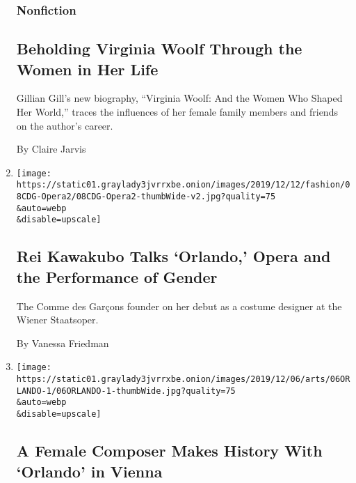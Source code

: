 \begin{enumerate}
  \hypertarget{nonfiction-1}{%
  \subsubsection{Nonfiction}\label{nonfiction-1}}

  \hypertarget{beholding-virginia-woolf-through-the-women-in-her-life}{%
  \subsection{Beholding Virginia Woolf Through the Women in Her
  Life}\label{beholding-virginia-woolf-through-the-women-in-her-life}}

  Gillian Gill's new biography, ``Virginia Woolf: And the Women Who
  Shaped Her World,'' traces the influences of her female family members
  and friends on the author's career.

  By Claire Jarvis
\item
  \href{/2019/12/08/style/rei-kawakubo-orlando-vienna-opera.html}{}

  \texttt{[image: https://static01.graylady3jvrrxbe.onion/images/2019/12/12/fashion/08CDG-Opera2/08CDG-Opera2-thumbWide-v2.jpg?quality=75\\\&auto=webp\\\&disable=upscale]}

  \hypertarget{rei-kawakubo-talks-orlando-opera-and-the-performance-of-gender}{%
  \subsection{Rei Kawakubo Talks `Orlando,' Opera and the Performance of
  Gender}\label{rei-kawakubo-talks-orlando-opera-and-the-performance-of-gender}}

  The Comme des Garçons founder on her debut as a costume designer at
  the Wiener Staatsoper.

  By Vanessa Friedman
\item
  \href{/2019/12/06/arts/music/orlando-vienna-opera.html}{}

  \texttt{[image: https://static01.graylady3jvrrxbe.onion/images/2019/12/06/arts/06ORLANDO-1/06ORLANDO-1-thumbWide.jpg?quality=75\\\&auto=webp\\\&disable=upscale]}

  \hypertarget{a-female-composer-makes-history-with-orlando-in-vienna}{%
  \subsection{A Female Composer Makes History With `Orlando' in
  Vienna}\label{a-female-composer-makes-history-with-orlando-in-vienna}}


\end{enumerate}
